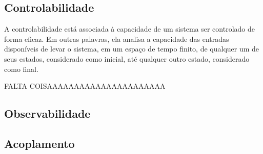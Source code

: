 \subsection{Controlabilidade}
A controlabilidade está associada à capacidade de um sistema ser controlado de forma eficaz. Em outras palavras, ela 
analisa a capacidade das entradas disponíveis de levar o sistema, em um espaço de tempo finito, de qualquer um de seus 
estados, considerado como inicial, até qualquer outro estado, considerado como final.

FALTA COISAAAAAAAAAAAAAAAAAAAAAA

\subsection{Observabilidade}
\lipsum[1]

\subsection{Acoplamento}
\lipsum[1]